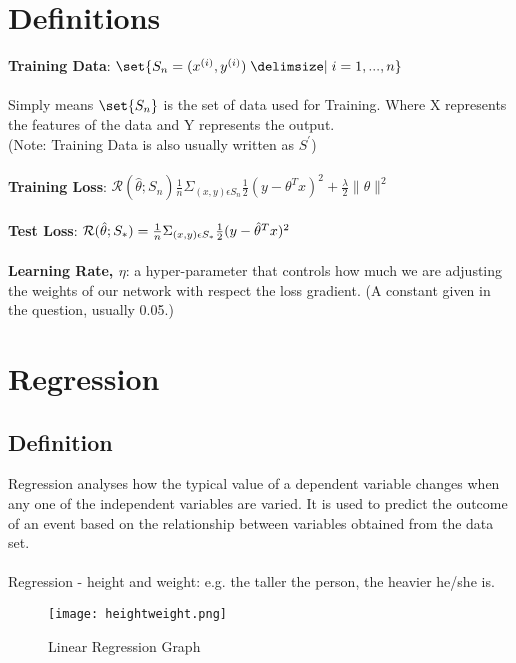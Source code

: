 \documentclass[a4paper]{article}
\begin{document}
\section{Definitions}

\textbf{Training Data}: $\set{ S_n = {(x^{(i)},y^{(i)}) \given i = 1, ..., n}}$\\ \\
Simply means $\set{S_n}$ is the set of data used for Training. Where X represents the features of the data and Y represents the output.\\
(Note: Training Data is also usually written as $S^\prime$) \\ \\
\textbf{Training Loss}: 
$\mathcal{R}(\hat{\theta} ; {S_n}) \frac{1}{n}{\Sigma_{(x,y)\epsilon S_n}} \frac{1}{2}(y - {\theta}^{T}x)^2 + \frac{\lambda}{2}\| \theta \|^2$ \\ \\ 
\textbf{Test Loss}: $\mathcal{R}(\hat{\theta} ; {S_*}) =  \frac{1}{n}{\Sigma_{(x,y)\epsilon S_*}} \frac{1}{2}(y - \Hat{\theta}^{T}x)^2$\\ \\
\textbf{Learning Rate, $\eta$}: a hyper-parameter that controls how much we are adjusting the weights of our network with respect the loss gradient. (A constant given in the question, usually 0.05.)

\section{Regression}

\subsection{Definition}

Regression analyses how the typical value of a dependent variable changes when any one of the independent variables are varied. It is used to predict the outcome of an event based on the relationship between variables obtained from the data set. \\ \\
Regression - height and weight: e.g. the taller the person, the heavier he/she is. \\
\begin{figure}[h]
    \centering
    \texttt{[image: heightweight.png]}
    \caption{Linear Regression Graph}
    \label{fig:my_label}
\end{figure} 
\pagebreak
\end{document}
